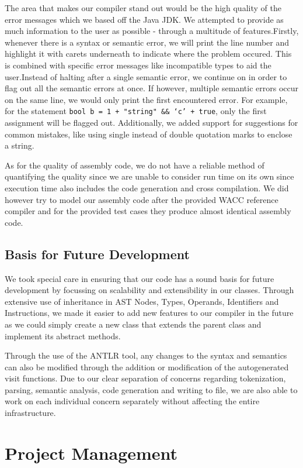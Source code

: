 \documentclass[11pt,a4paper]{article}
\begin{document}
The area that makes our compiler stand out would be the high quality of the error messages which we based off the Java JDK. We attempted to provide as much information to the user as possible - through a multitude of features.Firstly, whenever there is a syntax or semantic error, we will print the line number and highlight it with carets underneath to indicate where the problem occured. This is combined with specific error messages like incompatible types to aid the user.Instead of halting after a single semantic error, we continue on in order to flag out all the semantic errors at once. If however, multiple semantic errors occur on the same line, we would only print the first encountered error. For example, for the statement \texttt{bool b = 1 + "string" \&\& ‘c’ + true}, only the first assignment will be flagged out. Additionally, we added support for suggestions for common mistakes, like using single instead of double quotation marks to enclose a string.

As for the quality of assembly code, we do not have a reliable method of quantifying the quality since we are unable to consider run time on its own since execution time also includes the code generation and cross compilation. We did however try to model our assembly code after the provided WACC reference compiler and for the provided test cases they produce almost identical assembly code. 

\subsection{Basis for Future Development}
We took special care in ensuring that our code has a sound basis for future development by focussing on scalability and extensibility in our classes. Through extensive use of inheritance in AST Nodes, Types, Operands, Identifiers and Instructions, we made it easier to add new features to our compiler in the future as we could simply create a new class that extends the parent class and implement its abstract methods. 

Through the use of the ANTLR tool, any changes to the syntax and semantics can also be modified through the addition or modification of the autogenerated visit functions. Due to our clear separation of concerns regarding tokenization, parsing, semantic analysis, code generation and writing to file, we are also able to work on each individual concern separately without affecting the entire infrastructure. 


\section{Project Management}
\end{document}
